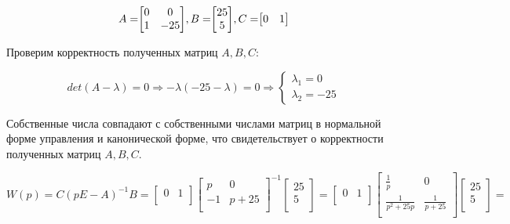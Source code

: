 \documentclass[14pt,a4paper,report]{report}
\begin{document}
\begin{equation*}
\text{$A=$}
\text{$
	\begin{bmatrix}
	0 & 0 \\
	1 & -25 \\
	\end{bmatrix}
	$}
\text{$, B=$}
\text{$
	\begin{bmatrix}
	25 \\
	5 \\
	\end{bmatrix}
	$}
\text{$, C=$}
\text{$
	\begin{bmatrix}
	0 & 1 \\
	\end{bmatrix}
	$}
\end{equation*}

Проверим корректность полученных матриц $A, B, C$:

\begin{equation*}
\text{$det(A-\lambda)=0$}
\Longrightarrow
\text{$-\lambda(-25-\lambda)=0$}
\Longrightarrow
\begin{cases}
	\text{$\lambda_1=0$} \\
	\text{$\lambda_2=-25$}
\end{cases}
\end{equation*}

Собственные числа совпадают с собственными числами матриц в нормальной форме управления и канонической форме, что свидетельствует о корректности полученных матриц  $A, B, C$.

\begin{equation*}
\text{$W(p)=C(pE-A)^{-1}B=
\begin{bmatrix}
0 & 1 \\
\end{bmatrix}
\begin{bmatrix}
p & 0 \\
-1 & p+25\\
\end{bmatrix}^{-1}
\begin{bmatrix}
25 \\
5 \\
\end{bmatrix}=
\begin{bmatrix}
0 & 1 \\
\end{bmatrix}
\begin{bmatrix}
\frac{1}{p} & 0 \\
\frac{1}{p^2+25p} & \frac{1}{p+25}\\
\end{bmatrix}
\begin{bmatrix}
25 \\
5 \\
\end{bmatrix}=
$}
\end{equation*}
\end{document}

